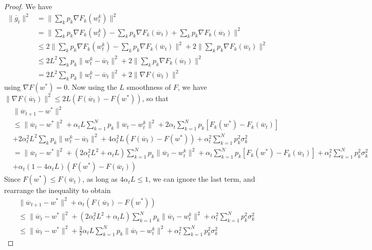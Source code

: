 \begin{proof}
	We have
	\begin{align*}
	\|\overline{g}_{t}\|^{2} & =\|\sum_{k}p_{k}\nabla F_{k}(w_{t}^{k})\|^{2}\\
	& =\|\sum_{k}p_{k}\nabla F_{k}(w_{t}^{k})-\sum_{k}p_{k}\nabla F_{k}(\overline{w}_{t})+\sum_{k}p_{k}\nabla F_{k}(\overline{w}_{t})\|^{2}\\
	& \leq2\|\sum_{k}p_{k}\nabla F_{k}(w_{t}^{k})-\sum_{k}p_{k}\nabla F_{k}(\overline{w}_{t})\|^{2}+2\|\sum_{k}p_{k}\nabla F_{k}(\overline{w}_{t})\|^{2}\\
	& \leq2L^{2}\sum_{k}p_{k}\|w_{t}^{k}-\overline{w}_{t}\|^{2}+2\|\sum_{k}p_{k}\nabla F_{k}(\overline{w}_{t})\|^{2}\\
	& =2L^{2}\sum_{k}p_{k}\|w_{t}^{k}-\overline{w}_{t}\|^{2}+2\|\nabla F(\overline{w}_{t})\|^{2}
	\end{align*}
	using $\nabla F(w^{\ast})=0$. Now using the $L$ smoothness of $F$,
	we have $\|\nabla F(\overline{w}_{t})\|^{2}\leq2L(F(\overline{w}_{t})-F(w^{\ast}))$,
	so that 
	\begin{align*}
	& \|\overline{w}_{t+1}-w^{\ast}\|^{2}\\
	& \leq\|\overline{w}_{t}-w^{\ast}\|^{2}+\alpha_{t}L\sum_{k=1}^{N}p_{k}\|\overline{w}_{t}-w_{t}^{k}\|^{2}+2\alpha_{t}\sum_{k=1}^{N}p_{k}\left[F_{k}(w^{\ast})-F_{k}(\overline{w}_{t})\right]\\
	& +2\alpha_{t}^{2}L^{2}\sum_{k}p_{k}\|w_{t}^{k}-\overline{w}_{t}\|^{2}+4\alpha_{t}^{2}L(F(\overline{w}_{t})-F(w^{\ast}))+\alpha_{t}^{2}\sum_{k=1}^{N}p_{k}^{2}\sigma_{k}^{2}\\
	& =\|\overline{w}_{t}-w^{\ast}\|^{2}+(2\alpha_{t}^{2}L^{2}+\alpha_{t}L)\sum_{k=1}^{N}p_{k}\|\overline{w}_{t}-w_{t}^{k}\|^{2}+\alpha_{t}\sum_{k=1}^{N}p_{k}\left[F_{k}(w^{\ast})-F_{k}(\overline{w}_{t})\right]+\alpha_{t}^{2}\sum_{k=1}^{N}p_{k}^{2}\sigma_{k}^{2}\\
	& +\alpha_{t}(1-4\alpha_{t}L)(F(w^{\ast})-F(\overline{w}_{t}))
	\end{align*}
	Since $F(w^{\ast})\leq F(\overline{w}_{t})$, as long as $4\alpha_{t}L\leq1$,
	we can ignore the last term, and rearrange the inequality to obtain
	\begin{align*}
	& \|\overline{w}_{t+1}-w^{\ast}\|^{2}+\alpha_{t}(F(\overline{w}_{t})-F(w^{\ast}))\\
	& \leq\|\overline{w}_{t}-w^{\ast}\|^{2}+(2\alpha_{t}^{2}L^{2}+\alpha_{t}L)\sum_{k=1}^{N}p_{k}\|\overline{w}_{t}-w_{t}^{k}\|^{2}+\alpha_{t}^{2}\sum_{k=1}^{N}p_{k}^{2}\sigma_{k}^{2}\\
	& \leq\|\overline{w}_{t}-w^{\ast}\|^{2}+\frac{3}{2}\alpha_{t}L\sum_{k=1}^{N}p_{k}\|\overline{w}_{t}-w_{t}^{k}\|^{2}+\alpha_{t}^{2}\sum_{k=1}^{N}p_{k}^{2}\sigma_{k}^{2}
	\end{align*}
	

\end{proof}
